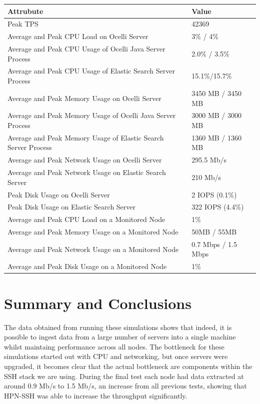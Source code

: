 \documentclass{llncs}
\begin{document}
\begin{flushleft}
    \begin{tabular}{ | l | l |}
    \hline
  Attrubute & Value  \\ \hline
  Peak TPS & 42369  \\ \hline
  Average and Peak CPU Load on Ocelli Server &3\% / 4\%  \\ \hline
  Average and Peak CPU Usage of Ocelli Java Server Process & 2.0\% / 3.5\% \\ \hline
 Average and Peak CPU Usage of Elastic Search Server Process & 15.1\%/15.7\%	  \\ \hline
  Average and Peak Memory Usage on Ocelli Server & 3450 MB / 3450 MB	 \\ \hline
  Average and Peak Memory Usage of Ocelli Java Server Process &	3000 MB / 3000 MB		 \\ \hline
 Average and Peak Memory Usage of Elastic Search Server Process &	1360 MB / 1360 MB		 \\ \hline
Average and Peak Network Usage on Ocelli Server &	295.5 Mb/s 	 \\ \hline
Average and Peak Network Usage on Elastic Search Server & 210 Mb/s 	 \\ \hline
Peak Disk Usage on Ocelli Server &	2 IOPS (0.1\%)		 \\ \hline
Peak Disk Usage on Elastic Search Server &	322 IOPS (4.4\%)		 \\ \hline
Average and Peak CPU Load on a Monitored Node& 	1\% 	 \\ \hline
  Average and Peak Memory Usage on a Monitored Node &	50MB / 55MB	 \\ \hline
Average and Peak Network Usage on a Monitored Node &	0.7 Mbps / 1.5 Mbps		 \\ \hline
  Average and Peak Disk Usage on a Monitored Node &  1\%	\\ 
    \hline
    \end{tabular}
\end{flushleft}

\section{Summary and Conclusions}

The data obtained from running these simulations shows that indeed, it is possible to ingest data from a large number of servers into a single machine whilst maintaing performance across all nodes. The bottleneck for these simulations started out with CPU and networking, but once servers were upgraded, it becomes clear that the actual bottleneck are components within the SSH stack we are using. During the final test each node had data extracted at around 0.9 Mb/s to 1.5 Mb/s, an increase from all previous tests, showing that HPN-SSH was able to increase the throughput significantly. 
\end{document}
